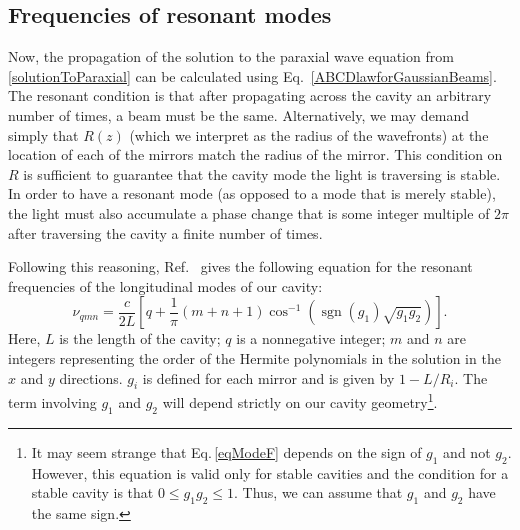 
\subsection{Frequencies of resonant modes}
Now, the propagation of the solution to the paraxial wave equation from \ref{solutionToParaxial} can be calculated using Eq.\ \ref{ABCDlawforGaussianBeams}. The resonant condition is that after propagating across the cavity an arbitrary number of times, a beam must be the same\cite{lasersMilonniEberly}.
Alternatively, we may demand simply that $R(z)$ (which we interpret as the radius of the wavefronts) at the location of each of the mirrors match the radius of the mirror. This condition on $R$ is sufficient to guarantee that the cavity mode the light is traversing is stable. In order to have a resonant mode (as opposed to a mode that is merely stable), the light must also accumulate a phase change that is some integer multiple of $2\pi$ after traversing the cavity a finite number of times.

Following this reasoning, Ref.\ \cite{lasersMilonniEberly} gives the following equation for the resonant frequencies of the longitudinal modes of our cavity:
\begin{equation} \label{eqModeF}
\nu_{qmn}=\frac{c}{2L}\left[q + \frac{1}{\pi}(m+n+1)\cos^{-1}(\operatorname{sgn}(g_1)\sqrt{g_1 g_2})\right]. 
\end{equation}
Here, $L$ is the length of the cavity; $q$ is a nonnegative integer; $m$ and $n$ are integers representing the order of the Hermite polynomials in the solution in the $x$ and $y$ directions. $g_i$ is defined for each mirror and is given by $1-L/R_i$. The term involving $g_1$ and $g_2$ will depend strictly on our cavity geometry\footnote{It may seem strange that Eq.\,\ref{eqModeF} depends on the sign of $g_1$ and not $g_2$. However, this equation is valid only for stable cavities and the condition for a stable cavity is that $0\leq g_1 g_2 \leq 1$. Thus, we can assume that $g_1$ and $g_2$ have the same sign.}.

